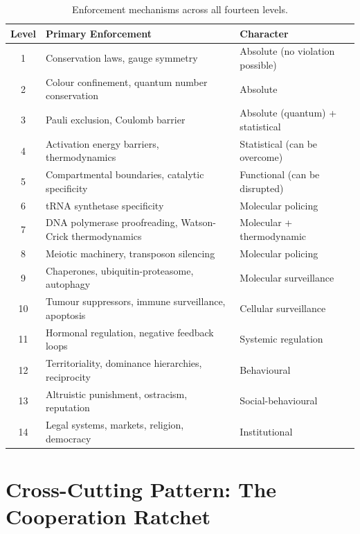 \documentclass[12pt,a4paper]{article}
\theoremstyle{remark}
\begin{document}
\begin{table}[htbp]
  \centering
  \caption{Enforcement mechanisms across all fourteen levels.}
  \label{tab:enforcement}
  \begin{tabularx}{\textwidth}{c X X}
    \toprule
    \textbf{Level} & \textbf{Primary Enforcement} & \textbf{Character} \\
    \midrule
    1  & Conservation laws, gauge symmetry                         & Absolute (no violation possible) \\
    2  & Colour confinement, quantum number conservation           & Absolute \\
    3  & Pauli exclusion, Coulomb barrier                          & Absolute (quantum) + statistical \\
    4  & Activation energy barriers, thermodynamics                & Statistical (can be overcome) \\
    5  & Compartmental boundaries, catalytic specificity           & Functional (can be disrupted) \\
    6  & tRNA synthetase specificity                               & Molecular policing \\
    7  & DNA polymerase proofreading, Watson-Crick thermodynamics  & Molecular + thermodynamic \\
    8  & Meiotic machinery, transposon silencing                   & Molecular policing \\
    9  & Chaperones, ubiquitin-proteasome, autophagy               & Molecular surveillance \\
    10 & Tumour suppressors, immune surveillance, apoptosis        & Cellular surveillance \\
    11 & Hormonal regulation, negative feedback loops              & Systemic regulation \\
    12 & Territoriality, dominance hierarchies, reciprocity        & Behavioural \\
    13 & Altruistic punishment, ostracism, reputation              & Social-behavioural \\
    14 & Legal systems, markets, religion, democracy               & Institutional \\
    \bottomrule
  \end{tabularx}
\end{table}


\section{Cross-Cutting Pattern: The Cooperation Ratchet}
\label{sec:cooperation_ratchet}
\end{document}
